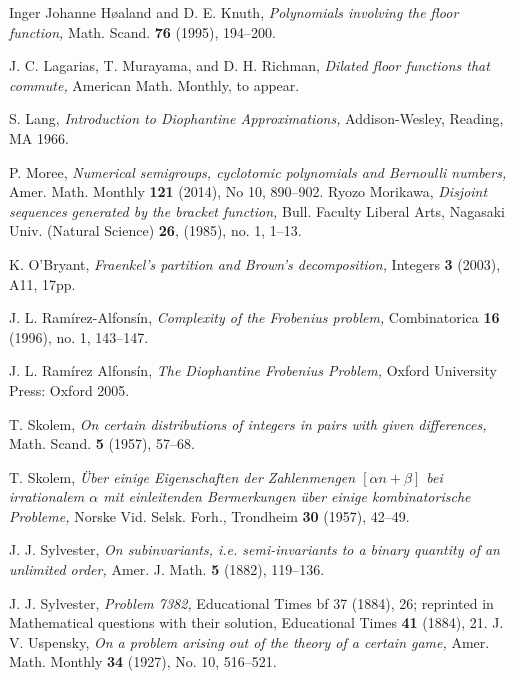 \documentclass[12pt,letterpaper, reqno]{amsart}
\theoremstyle{definition}
\theoremstyle{remark}
\begin{document}
\begin{thebibliography}{99}
 
 Inger Johanne H\o{a}land and D. E. Knuth,
 \emph{Polynomials involving the floor function,}
 Math. Scand. {\bf 76} (1995), 194--200.

 J. C. Lagarias, T. Murayama, and D. H. Richman,
 \emph{Dilated floor functions that commute,} American
 Math. Monthly, to appear.
 
 S. Lang,
 \emph{Introduction to Diophantine Approximations,}
 Addison-Wesley, Reading, MA 1966.
 
 P. Moree,
 \emph{Numerical semigroups, cyclotomic polynomials and Bernoulli numbers,}
 Amer. Math. Monthly {\bf 121} (2014), No 10, 890--902.
 Ryozo Morikawa,
 \emph{Disjoint sequences generated by the bracket function,}
 Bull. Faculty Liberal Arts, Nagasaki Univ. (Natural Science) {\bf 26}, (1985), no. 1, 1--13.
 
 K. O'Bryant,
 \emph{Fraenkel's partition and Brown's decomposition,}
 Integers {\bf 3} (2003), A11, 17pp.
 
 J. L. Ram\'{i}rez-Alfons\'{i}n,
 \emph{Complexity of the Frobenius problem,}
 Combinatorica {\bf 16} (1996), no. 1, 143--147.
 
 J. L. Ram\'{i}rez Alfons\'{i}n,
 \emph{The Diophantine Frobenius Problem,}
 Oxford University Press: Oxford 2005.
 
 T. Skolem,
 \emph{On certain distributions of integers in pairs with given differences,}
 Math. Scand. {\bf 5} (1957), 57--68.
 
 T. Skolem,
 \emph{\"{U}ber einige Eigenschaften der Zahlenmengen $[\alpha n + \beta]$ bei irrationalem $\alpha$
 mit einleitenden Bermerkungen \"{u}ber einige kombinatorische Probleme,}
 Norske Vid. Selsk. Forh., Trondheim {\bf 30} (1957), 42--49.

J. J. Sylvester,
\emph{On subinvariants, i.e. semi-invariants to a binary quantity of an unlimited order,}
Amer. J. Math. {\bf 5} (1882), 119--136.

J. J. Sylvester,
\emph{Problem 7382,}
Educational Times {bf 37} (1884), 26;
reprinted in Mathematical questions with their solution,
Educational Times {\bf 41} (1884), 21. 
 J. V. Uspensky,
 \emph{On a problem arising out of the theory of a certain game,}
 Amer. Math. Monthly {\bf 34}  (1927),  No. 10, 516--521.

 \end{thebibliography}
\end{document}
